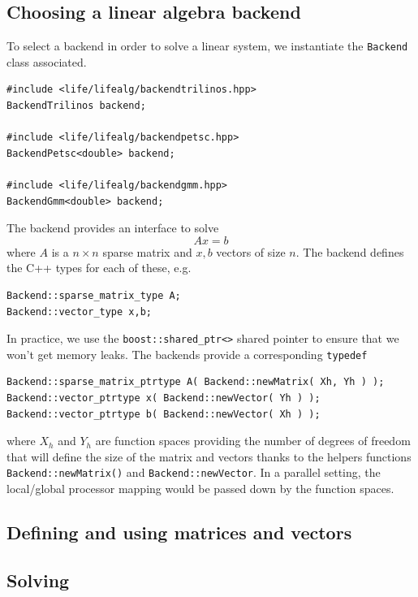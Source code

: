 \documentclass[11pt]{article}
\newcommand{\cpp}{C{\hspace{-.3em}\vspace{-.2em}\tiny++}\xspace}
\begin{document}
\subsection{Choosing a linear algebra backend}
\label{sec:choos-line-algebra}

To select a backend in order to solve a linear system, we instantiate
the \lstinline!Backend! class associated.

\begin{lstlisting}
#include <life/lifealg/backendtrilinos.hpp>
BackendTrilinos backend;

#include <life/lifealg/backendpetsc.hpp>
BackendPetsc<double> backend;

#include <life/lifealg/backendgmm.hpp>
BackendGmm<double> backend;
\end{lstlisting}

The backend provides an interface to solve
\begin{equation}
  \label{eq:8}
  A x = b
\end{equation}
\noindent
where $A$ is a $n \times n $ sparse matrix and $x,b$ vectors of size $n$.
The backend defines the \cpp types for  each of these, e.g.
\begin{lstlisting}
Backend::sparse_matrix_type A;
Backend::vector_type x,b;
\end{lstlisting}
\noindent
In practice, we use the \lstinline!boost::shared_ptr<>! shared pointer
to ensure that we won't get memory leaks. The backends provide a
corresponding \lstinline!typedef!


\begin{lstlisting}
Backend::sparse_matrix_ptrtype A( Backend::newMatrix( Xh, Yh ) );
Backend::vector_ptrtype x( Backend::newVector( Yh ) );
Backend::vector_ptrtype b( Backend::newVector( Xh ) );
\end{lstlisting}
\noindent
where $X_h$ and $Y_h$ are function spaces providing the number of
degrees of freedom that will define the size of the matrix and vectors
thanks to the helpers functions \lstinline!Backend::newMatrix()! and
\lstinline!Backend::newVector!. In a parallel setting, the
local/global processor mapping would be passed down by the function
spaces.

\subsection{Defining and using matrices and vectors}
\label{sec:defin-using-matr}

\subsection{Solving}
\label{sec:solving}
\end{document}
